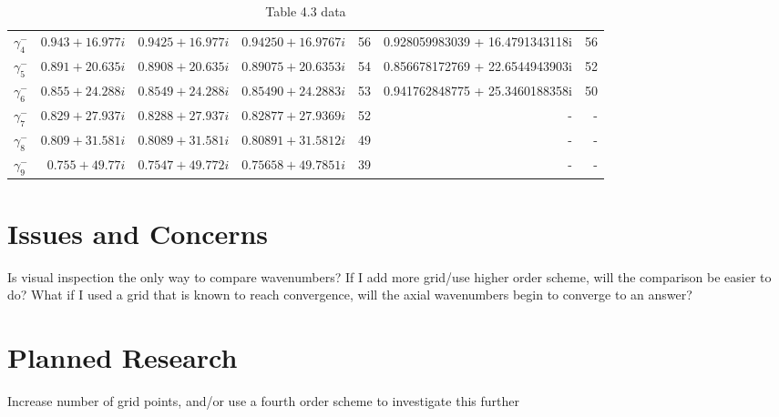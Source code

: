\documentclass[a4paper]{article}
\begin{document}
\begin{table}
\begin{adjustbox}{width=1\textwidth}
\begin{tabular}{c | r | r | r | r | r | r}
 $\gamma_4^{-}$ & $ 0.943 + 16.977 i $ & $ 0.9425 + 16.977 i$ & $ 0.94250  + 16.9767 i$ & 56  &0.928059983039 +  16.4791343118i& 56  \\
 $\gamma_5^{-}$ & $ 0.891 + 20.635 i $ & $ 0.8908 + 20.635 i$ & $ 0.89075  + 20.6353 i$ & 54  &0.856678172769 +  22.6544943903i & 52 \\
 $\gamma_6^{-}$ & $ 0.855 + 24.288 i $ & $ 0.8549 + 24.288 i$ & $ 0.85490  + 24.2883 i$ & 53  &0.941762848775 +  25.3460188358i & 50 \\
 $\gamma_7^{-}$ & $ 0.829 + 27.937 i $ & $ 0.8288 + 27.937 i$ & $ 0.82877  + 27.9369 i$ & 52  &- & - \\
 $\gamma_8^{-}$ & $ 0.809 + 31.581 i $ & $ 0.8089 + 31.581 i$ & $ 0.80891  + 31.5812 i$ & 49  &- & - \\
 $\gamma_9^{-}$ & $ 0.755 + 49.77  i $ & $ 0.7547 + 49.772 i$ & $ 0.75658  + 49.7851 i$ & 39  &- & - \\ \hline
 \end{tabular}
\end{adjustbox}
 \caption{Table 4.3 data}
 \label{Table43}
\end{table}

\section{Issues and Concerns}
Is visual inspection the only way to compare wavenumbers? If I add more grid/use higher order scheme, 
will the comparison be easier to do? What if I used a grid that is known to reach
convergence, will the axial wavenumbers begin to converge to an answer?

\section{Planned Research}
Increase number of grid points, and/or use a fourth order scheme to investigate
this further
\end{document}
